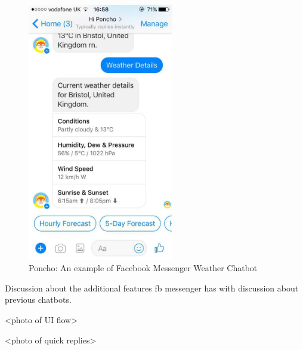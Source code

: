 \begin{figure}[H] %
    \centering
    \includegraphics[width=2.5in]{../resources/existing-bots/poncho.jpg}
    \caption{Poncho: An example of Facebook Messenger Weather Chatbot}
    \label{fig:poncho}
\end{figure}

Discussion about the additional features fb messenger has with discussion about previous chatbots.

<photo of UI flow>

<photo of quick replies>

